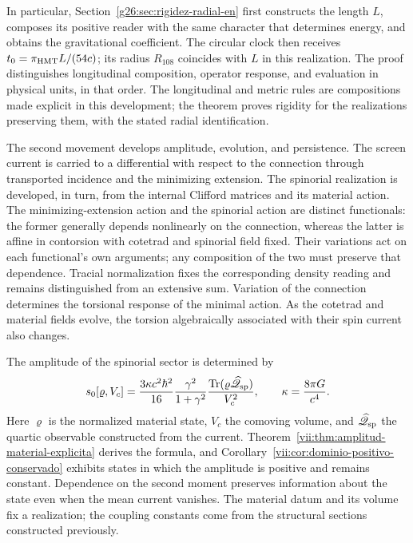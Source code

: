 In particular, Section~\ref{g26:sec:rigidez-radial-en} first constructs
the length \(L\), composes its positive reader with the same character
that determines energy, and obtains the gravitational coefficient.
The circular clock then receives
\(t_0=\pi_{\rm HMT}L/(54c)\); its radius \(R_{108}\) coincides
with \(L\) in this realization. The proof distinguishes longitudinal
composition, operator response, and evaluation in physical units, in that
order. The longitudinal and metric rules are compositions made explicit
in this development; the theorem proves rigidity for the realizations
preserving them, with the stated radial identification.

The second movement develops amplitude, evolution, and persistence.
The screen current is carried to a differential with respect to the
connection through transported incidence and the minimizing extension.
The spinorial realization is developed, in turn, from the internal
Clifford matrices and its material action. The minimizing-extension
action and the spinorial action are distinct functionals: the former
generally depends nonlinearly on the connection, whereas the latter is
affine in contorsion with cotetrad and spinorial field fixed. Their
variations act on each functional's own arguments; any composition of
the two must preserve that dependence.
Tracial normalization
fixes the corresponding density reading and remains distinguished from
an extensive sum. Variation of the connection determines the torsional
response of the minimal action. As the cotetrad and material fields evolve,
the torsion algebraically associated with their spin current also changes.

The amplitude of the spinorial sector is determined by
\begin{equation}
 s_0[\varrho,V_c]
 =\frac{3\kappa c^2\hbar^2}{16}
   \frac{\gamma^2}{1+\gamma^2}
   \frac{\operatorname{Tr}
    (\varrho\widehat{\mathscr Q}_{\rm sp})}{V_c^2},
 \qquad \kappa=\frac{8\pi G}{c^4}.
 \label{vii:eq:programa-amplitud}
\end{equation}
Here \(\varrho\) is the normalized material state, \(V_c\) the comoving
volume, and \(\widehat{\mathscr Q}_{\rm sp}\) the quartic observable
constructed from the current.
Theorem~\ref{vii:thm:amplitud-material-explicita} derives the formula, and
Corollary~\ref{vii:cor:dominio-positivo-conservado} exhibits states
in which the amplitude is positive and remains constant. Dependence
on the second moment preserves information about the state even when
the mean current vanishes. The material datum and its volume fix a
realization; the coupling constants come from the structural
sections constructed previously.

